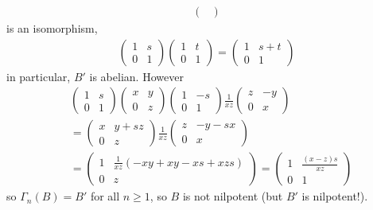 \begin{*example}
\begin{align*}
\begin{pmatrix}
		\end{pmatrix}
	\end{align*}
	is an isomorphism,
	\begin{align*}
		\begin{pmatrix}
			1 & s\\ 0 & 1
		\end{pmatrix}
		\begin{pmatrix}
			1 & t\\ 0 & 1
		\end{pmatrix}
		= 
		\begin{pmatrix}
			1 & s+t\\ 0 & 1
		\end{pmatrix}
	\end{align*}
	in particular, $B'$ is abelian. However
	\begin{align*}
		&\begin{pmatrix}
			1 & s\\ 0 & 1
		\end{pmatrix}
		\begin{pmatrix}
			x & y\\ 0 & z
		\end{pmatrix}
		\begin{pmatrix}
			1 &-s\\ 0 & 1
		\end{pmatrix}
		\frac{1}{xz}\begin{pmatrix}
			z & -y\\ 0 & x
		\end{pmatrix}\\
		&= \begin{pmatrix}
			x & y +sz\\ 0 & z
		\end{pmatrix}
		\frac{1}{xz}\begin{pmatrix}
			z & -y-sx\\ 0 & x
		\end{pmatrix}\\
		&= \begin{pmatrix}
			1 & \frac{1}{xz} (-xy + xy -xs + xzs)\\ 0 & z
		\end{pmatrix}
		= \begin{pmatrix}
			1 & \frac{(x-z)s}{xz}\\ 0 & 1
		\end{pmatrix}
	\end{align*}
	so $\Gamma_n(B) = B'$ for all $n \ge 1$, so $B$ is not nilpotent (but $B'$ is nilpotent!).
\end{*example}
